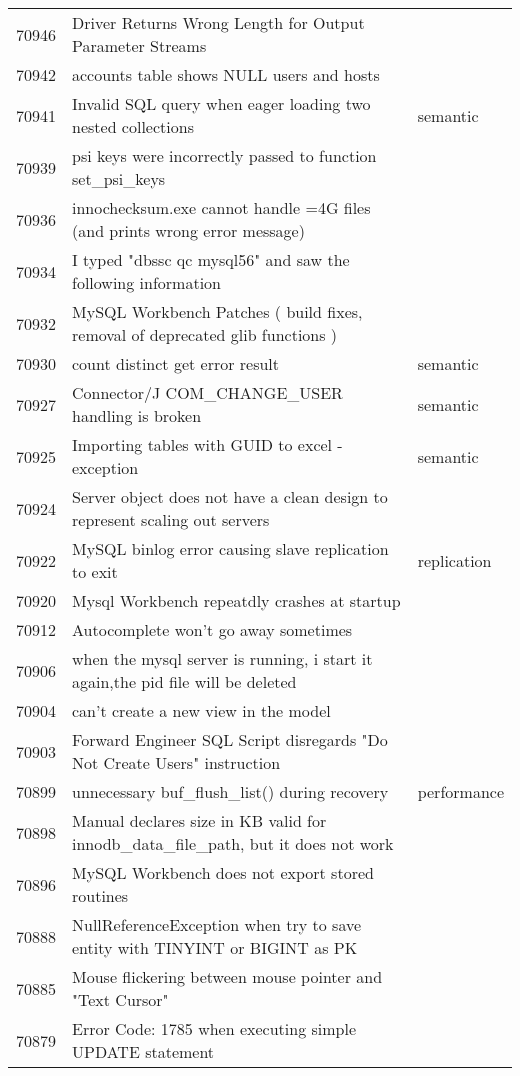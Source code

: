 \begin{longtable}[c]{p{1cm}p{10cm}p{1cm}}
70946 & Driver Returns Wrong Length for Output Parameter Streams &  \\
70942 & accounts table shows NULL users and hosts &  \\
70941 & Invalid SQL query when eager loading two nested collections & semantic \\
70939 & psi keys were incorrectly passed to function set\_psi\_keys &  \\
70936 & innochecksum.exe cannot handle =4G files (and prints wrong error message) &  \\
70934 & I typed "dbssc qc mysql56" and saw the following information &  \\
70932 & MySQL Workbench Patches ( build fixes, removal of deprecated glib functions ) &  \\
70930 & count distinct get error result & semantic \\
70927 & Connector/J COM\_CHANGE\_USER handling is broken & semantic \\
70925 & Importing tables with GUID to excel - exception & semantic \\
70924 & Server object does not have a clean design to represent scaling out servers &  \\
70922 & MySQL binlog error causing slave replication to exit & replication \\
70920 & Mysql Workbench repeatdly crashes at startup &  \\
70912 & Autocomplete won't go away sometimes &  \\
70906 & when the mysql server is running, i start it again,the pid file will be deleted &  \\
70904 & can't create a new view in the model &  \\
70903 & Forward Engineer SQL Script disregards "Do Not Create Users" instruction &  \\
70899 & unnecessary buf\_flush\_list() during recovery & performance \\
70898 & Manual declares size in KB valid for innodb\_data\_file\_path, but it does not work &  \\
70896 & MySQL Workbench does not export stored routines &  \\
70888 & NullReferenceException when try to save entity with TINYINT or BIGINT as PK &  \\
70885 & Mouse flickering between mouse pointer and "Text Cursor" &  \\
70879 & Error Code: 1785 when executing simple UPDATE statement &  \\

\end{longtable}
